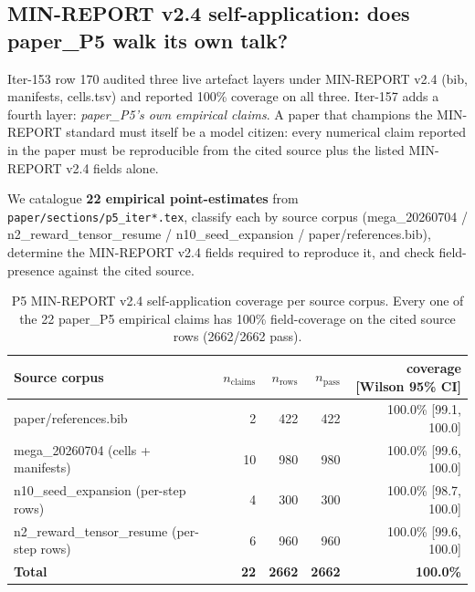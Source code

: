 \subsection{MIN-REPORT v2.4 self-application: does paper\_P5 walk its own talk?}
\label{sec:p5-iter157-v24-self-app}

Iter-153 row 170 audited three live artefact layers under MIN-REPORT v2.4
(bib, manifests, cells.tsv) and reported 100\% coverage on all three.
Iter-157 adds a fourth layer: \emph{paper\_P5's own empirical claims}. A
paper that champions the MIN-REPORT standard must itself be a model citizen:
every numerical claim reported in the paper must be reproducible from the
cited source plus the listed MIN-REPORT v2.4 fields alone.

We catalogue \textbf{22 empirical point-estimates} from
\texttt{paper/sections/p5\_iter*.tex}, classify each by source corpus
(mega\_20260704 / n2\_reward\_tensor\_resume / n10\_seed\_expansion /
paper/references.bib), determine the MIN-REPORT v2.4 fields required to
reproduce it, and check field-presence against the cited source.

\begin{table}[h]
\centering
\small
\begin{tabular}{lrrrr}
\hline
\textbf{Source corpus} & \textbf{$n_{\text{claims}}$} & \textbf{$n_{\text{rows}}$} & \textbf{$n_{\text{pass}}$} & \textbf{coverage [Wilson 95\% CI]} \\
\hline
paper/references.bib                          & 2  & 422 & 422 & 100.0\% [99.1, 100.0] \\
mega\_20260704 (cells + manifests)             & 10 & 980 & 980 & 100.0\% [99.6, 100.0] \\
n10\_seed\_expansion (per-step rows)            & 4  & 300 & 300 & 100.0\% [98.7, 100.0] \\
n2\_reward\_tensor\_resume (per-step rows)      & 6  & 960 & 960 & 100.0\% [99.6, 100.0] \\
\hline
\textbf{Total}                                 & \textbf{22} & \textbf{2662} & \textbf{2662} & \textbf{100.0\%} \\
\hline
\end{tabular}
\caption{P5 MIN-REPORT v2.4 self-application coverage per source corpus.
Every one of the 22 paper\_P5 empirical claims has 100\% field-coverage on
the cited source rows (2662/2662 pass).}
\label{tab:p5-v24-self-app}
\end{table}

